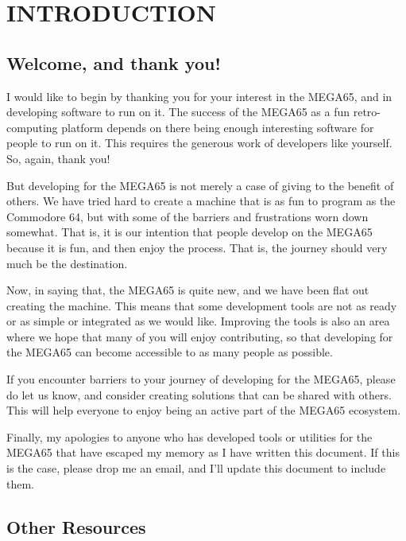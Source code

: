 







\cleardoublepage

\part{INTRODUCTION}

\chapter{Welcome, and thank you!}

I would like to begin by thanking you for your interest in the MEGA65,
and in developing software to run on it. The success of the MEGA65 as
a fun retro-computing platform depends on there being enough
interesting software for people to run on it.  This requires the
generous work of developers like yourself. So, again, thank you!

But developing for the MEGA65 is not merely a case of giving to the
benefit of others. We have tried hard to create a machine that is as
fun to program as the Commodore 64, but with some of the barriers
and frustrations worn down somewhat.  That is, it is our intention
that people develop on the MEGA65 because it is fun, and then enjoy
the process.  That is, the journey should very much be the
destination.

Now, in saying that, the MEGA65 is quite new, and we have been flat
out creating the machine. This means that some development tools are
not as ready or as simple or integrated as we would like.  Improving
the tools is also an area where we hope that many of you will enjoy
contributing, so that developing for the MEGA65 can become accessible
to as many people as possible.

If you encounter barriers to your
journey of developing for the MEGA65, please do let us know, and
consider creating solutions that can be shared with others.  This will
help everyone to enjoy being an active part of the MEGA65 ecosystem.

Finally, my apologies to anyone who has developed tools or utilities
for the MEGA65 that have escaped my memory as I have written this
document.  If this is the case, please drop me an email, and I'll
update this document to include them.

\chapter{Other Resources}

